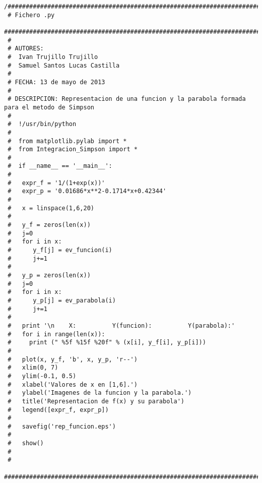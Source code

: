 \begin{center}
\begin{footnotesize}
\begin{verbatim}
/###################################################################################
 # Fichero .py
 ###################################################################################
 #
 # AUTORES:
 #  Ivan Trujillo Trujillo
 #  Samuel Santos Lucas Castilla
 #
 # FECHA: 13 de mayo de 2013
 #
 # DESCRIPCION: Representacion de una funcion y la parabola formada para el metodo de Simpson
 #  
 #  !/usr/bin/python
 # 
 #  from matplotlib.pylab import *
 #  from Integracion_Simpson import *
 #
 #  if __name__ == '__main__':
 # 
 #   expr_f = '1/(1+exp(x))'
 #   expr_p = '0.01686*x**2-0.1714*x+0.42344'
 #
 #   x = linspace(1,6,20)
 # 
 #   y_f = zeros(len(x))
 #   j=0
 #   for i in x:
 #      y_f[j] = ev_funcion(i)
 #      j+=1
 #
 #   y_p = zeros(len(x))
 #   j=0
 #   for i in x:
 #      y_p[j] = ev_parabola(i)
 #      j+=1
 #
 #   print '\n    X:          Y(funcion):          Y(parabola):'
 #   for i in range(len(x)):
 #     print (" %5f %15f %20f" % (x[i], y_f[i], y_p[i]))
 #
 #   plot(x, y_f, 'b', x, y_p, 'r--')
 #   xlim(0, 7)
 #   ylim(-0.1, 0.5)
 #   xlabel('Valores de x en [1,6].')
 #   ylabel('Imagenes de la funcion y la parabola.')
 #   title('Representacion de f(x) y su parabola')
 #   legend([expr_f, expr_p])
 # 
 #   savefig('rep_funcion.eps')
 #
 #   show()
 #
 #
 ##################################################################################
\end{verbatim}
\end{footnotesize}
\end{center}
